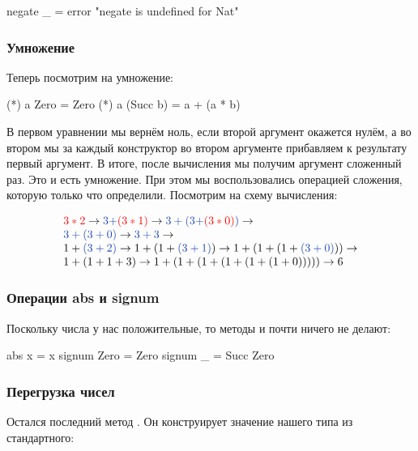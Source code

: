 \begin{code}
    negate _ = error "negate is undefined for Nat"
\end{code}

\subsubsection{Умножение}

Теперь посмотрим на умножение:

\begin{code}
    (*) a Zero     = Zero
    (*) a (Succ b) = a + (a * b)     
\end{code}

В первом уравнении мы вернём ноль, если второй аргумент
окажется нулём, а во втором мы за каждый конструктор 
 во втором аргументе прибавляем к результату 
первый аргумент. В итоге, после вычисления  
мы получим аргумент  сложенный  раз. Это
и есть умножение. 
При этом мы воспользовались операцией сложения, которую только
что определили. 
Посмотрим на схему вычисления:

\[ 
\begin{array}{l}
\Red{3*2} \Ra \Blue{3+}\Red{(3*1)} \Ra \Blue{3+(3+}\Red{(3*0)}\Blue{)} \Ra \\ 
\Blue{3+(3+0)} \Ra \Blue{3+3} \Ra \\
1+\Blue{(3+2)} \Ra 1+(1+\Blue{(3+1)}) \Ra 1+(1+(1+\Blue{(3+0)})) \Ra \\
1+(1+1+3) \Ra 1+(1+(1+(1+(1+(1+0))))) \Ra 6
\end{array}
\]

\subsubsection{Операции abs и signum}

Поскольку числа у нас положительные, то методы 
и  почти ничего не делают:

\begin{code}
    abs    x    = x 
    signum Zero = Zero
    signum _    = Succ Zero
\end{code}


\subsubsection{Перегрузка чисел}

Остался последний метод . Он конструирует
значение нашего типа из стандартного:

